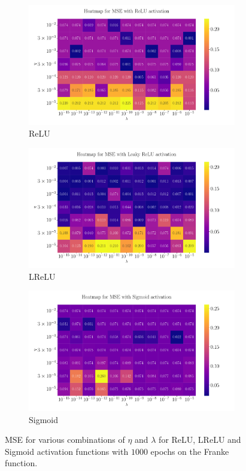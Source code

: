 \documentclass[%
reprint,
amsmath,amssymb,
aps,
]{revtex4-2}
\begin{document}
\begin{figure}[ht!]
	\begin{subfigure}{0.4353\textwidth}
		\includegraphics[width=\textwidth]{Python/Figures/Heatmap_MSE_ReLU_Franke.pdf}
		\caption{ReLU}
	\end{subfigure}
	\hfill
	\begin{subfigure}{0.4353\textwidth}
		\includegraphics[width=\textwidth]{Python/Figures/Heatmap_MSE_Leaky ReLU_Franke.pdf}
		\caption{LReLU}
	\end{subfigure}
	\hfill\newline
	\begin{subfigure}{0.4353\textwidth}
		\includegraphics[width=\textwidth]{Python/Figures/Heatmap_MSE_Sigmoid_Franke.pdf}
		\caption{Sigmoid}
	\end{subfigure}
	\caption{MSE for various combinations of $\eta$ and $\lambda$ for ReLU, LReLU and Sigmoid activation functions with $1000$ epochs on the Franke function.}
	\label{fig:FFNN_Franke_heatmaps}
\end{figure}
\end{document}
